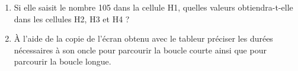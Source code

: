 \begin{enumerate}
\item Si elle saisit le nombre 105 dans la cellule H1, quelles valeurs obtiendra-t-elle dans les cellules H2, H3 et H4 ? 
\item À l'aide de la copie de l'écran obtenu avec le tableur préciser les durées nécessaires à son oncle pour parcourir la boucle courte ainsi que pour parcourir la boucle longue. 
\end{enumerate}
 

\vspace{0,5cm}

